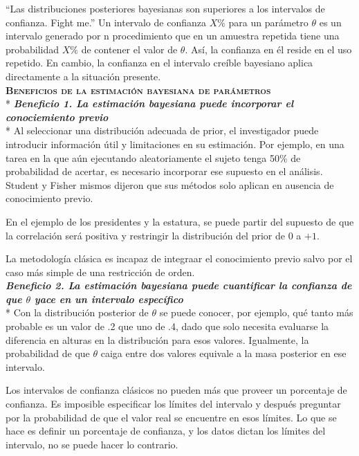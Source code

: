 \documentclass[a4paper,12pt]{article}
\begin{document}
``Las distribuciones posteriores bayesianas son superiores a los intervalos de confianza. Fight me.'' Un intervalo de confianza $X\%$ para un parámetro $\theta$ es un intervalo generado por  n procedimiento que en un amuestra repetida tiene una probabilidad $X\%$ de contener el valor de $\theta$. Así, la confianza en él reside en el uso repetido. En cambio, la confianza en el intervalo creíble bayesiano aplica directamente a la situación presente.\\

{\scshape\bfseries Beneficios de la estimación bayesiana de parámetros}\\*
{\slshape\bfseries Beneficio 1. La estimación bayesiana puede incorporar el conociemiento previo}\\*
Al seleccionar una distribución adecuada de prior, el investigador puede introducir información útil y limitaciones en su estimación. Por ejemplo, en una tarea en la que aún ejecutando aleatoriamente el sujeto tenga 50\% de probabilidad de acertar, es necesario incorporar ese supuesto en el análisis. Student y Fisher mismos dijeron que sus métodos solo aplican en ausencia de conocimiento previo.

En el ejemplo de los presidentes y la estatura, se puede partir del supuesto de que la correlación será positiva y restringir la distribución del prior de $0$ a $+1$.

La metodología clásica es incapaz de integraar el conocimiento previo salvo por el caso más simple de una restricción de orden.\\

{\slshape\bfseries Beneficio 2. La estimación bayesiana puede cuantificar la confianza de que $\theta$ yace en un intervalo específico}\\*
Con la distribución posterior de $\theta$ se puede conocer, por ejemplo, qué tanto más probable es un valor de .2 que uno de .4, dado que solo necesita evaluarse la diferencia en alturas en la distribución para esos valores. Igualmente, la probabilidad de que $\theta$ caiga entre dos valores equivale a la masa posterior en ese intervalo.

Los intervalos de confianza clásicos no pueden más que proveer un porcentaje de confianza. Es imposible especificar los límites del intervalo y después preguntar por la probabilidad de que el valor real se encuentre en esos límites. Lo que se hace es definir un porcentaje de confianza, y los datos dictan los límites del intervalo, no se puede hacer lo contrario.
\end{document}
